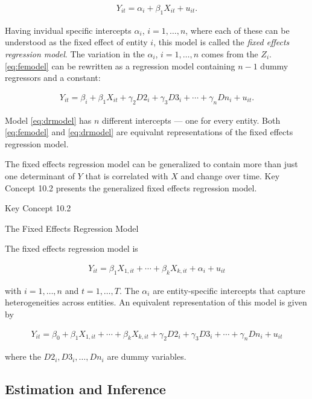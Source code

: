 \documentclass[]{book}
\theoremstyle{definition}
\theoremstyle{definition}
\theoremstyle{definition}
\theoremstyle{remark}
\begin{document}
\begin{align}
Y_{it} = \alpha_i + \beta_1 X_{it} + u_{it} \label{eq:femodel}.
\end{align}

Having invidual specific intercepts \(\alpha_i\), \(i=1,\dots,n\), where
each of these can be understood as the fixed effect of entity \(i\),
this model is called the \emph{fixed effects regression model}. The
variation in the \(\alpha_i\), \(i=1,\dots,n\) comes from the \(Z_i\).
\eqref{eq:femodel} can be rewritten as a regression model containing
\(n-1\) dummy regressors and a constant:

\begin{align}
Y_{it} = \beta_i + \beta_1 X_{it} + \gamma_2 D2_i + \gamma_3 D3_i + \cdots + \gamma_n Dn_i + u_{it} \label{eq:drmodel}.
\end{align}

Model \eqref{eq:drmodel} has \(n\) different intercepts --- one for every
entity. Both \eqref{eq:femodel} and \eqref{eq:drmodel} are equivalnt
representations of the fixed effects regression model.

The fixed effects regression model can be generalized to contain more
than just one determinant of \(Y\) that is correlated with \(X\) and
change over time. Key Concept 10.2 presents the generalized fixed
effects regression model.

Key Concept 10.2

The Fixed Effects Regression Model

The fixed effects regression model is

\begin{align}
Y_{it} = \beta_1 X_{1,it} + \cdots + \beta_k X_{k,it} + \alpha_i + u_{it} \label{eq:gfemodel}
\end{align}

with \(i=1,\dots,n\) and \(t=1,\dots,T\). The \(\alpha_i\) are
entity-specific intercepts that capture heterogeneities across entities.
An equivalent representation of this model is given by

\begin{align}
Y_{it} = \beta_0 + \beta_1 X_{1,it} + \cdots + \beta_k X_{k,it} + \gamma_2 D2_i + \gamma_3 D3_i + \cdots + \gamma_n Dn_i  + u_{it} \label{eq:gdrmodel}
\end{align}

where the \(D2_i,D3_i,\dots,Dn_i\) are dummy variables.

\subsection*{Estimation and Inference}\label{estimation-and-inference}
\end{document}
